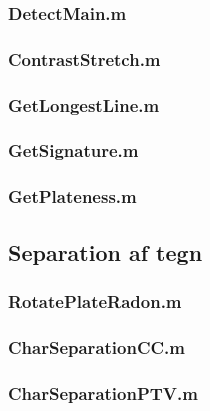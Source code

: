 \documentclass[11pt,a4paper,final]{article}
\begin{document}
\subsubsection{DetectMain.m}
\label{code:DetectMain}


\subsubsection{ContrastStretch.m}
\label{code:ContrastStretch}


\subsubsection{GetLongestLine.m}
\label{code:GetLongestLine}


\subsubsection{GetSignature.m}
\label{code:GetSignature}


\subsubsection{GetPlateness.m}
\label{code:GetPlateness}



\subsection{Separation af tegn}
\subsubsection{RotatePlateRadon.m}
\label{code: RotatePlateRadon}


\subsubsection{CharSeparationCC.m}
\label{code:CharSeparationCC}


\subsubsection{CharSeparationPTV.m}
\label{code:CharSeparationPTV}

\end{document}
